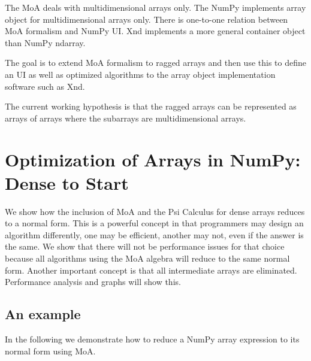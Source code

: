 \documentclass[a4paper,12pt]{article}
\begin{document}
The MoA deals with multidimensional arrays only.  The NumPy implements
array object for multidimensional arrays only. There is one-to-one
relation between MoA formalism and NumPy UI. Xnd implements a more
general container object than NumPy ndarray.

The goal is to extend MoA formalism to ragged arrays and then use this
to define an UI as well as optimized algorithms to the array object
implementation software such as Xnd. 

The current working hypothesis is that the ragged arrays can be
represented as arrays of arrays where the subarrays are
multidimensional arrays.

\section{Optimization of Arrays in NumPy: Dense to Start}
We show how the inclusion of MoA and the Psi Calculus for dense arrays
reduces to a normal form. This is a powerful concept in that programmers may design an algorithm differently, one may be efficient, another may not, even if the answer is the same. 
\noindent
We show that there will not be performance issues for that choice because all algorithms using the MoA algebra will reduce to the same normal form. Another important concept is that all intermediate arrays are eliminated. Performance analysis and graphs will show this.

\subsection{An example}

In the following we demonstrate how to reduce a NumPy array expression
to its normal form using MoA.
\end{document}
